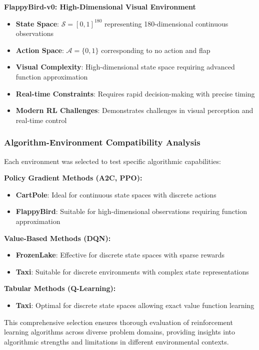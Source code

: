 \documentclass[12pt]{article}
\begin{document}
{{{\textbf{FlappyBird-v0: High-Dimensional Visual Environment}
\begin{itemize}
    \item \textbf{State Space}: $\mathcal{S} = [0,1]^{180}$ representing 180-dimensional continuous observations
    \item \textbf{Action Space}: $\mathcal{A} = \{0, 1\}$ corresponding to no action and flap
    \item \textbf{Visual Complexity}: High-dimensional state space requiring advanced function approximation
    \item \textbf{Real-time Constraints}: Requires rapid decision-making with precise timing
    \item \textbf{Modern RL Challenges}: Demonstrates challenges in visual perception and real-time control
\end{itemize}

\subsubsection{Algorithm-Environment Compatibility Analysis}

Each environment was selected to test specific algorithmic capabilities:

\textbf{Policy Gradient Methods (A2C, PPO):}
\begin{itemize}
    \item \textbf{CartPole}: Ideal for continuous state spaces with discrete actions
    \item \textbf{FlappyBird}: Suitable for high-dimensional observations requiring function approximation
\end{itemize}

\textbf{Value-Based Methods (DQN):}
\begin{itemize}
    \item \textbf{FrozenLake}: Effective for discrete state spaces with sparse rewards
    \item \textbf{Taxi}: Suitable for discrete environments with complex state representations
\end{itemize}

\textbf{Tabular Methods (Q-Learning):}
\begin{itemize}
    \item \textbf{Taxi}: Optimal for discrete state spaces allowing exact value function learning
\end{itemize}

This comprehensive selection ensures thorough evaluation of reinforcement learning algorithms across diverse problem domains, providing insights into algorithmic strengths and limitations in different environmental contexts.

}}}
\end{document}
